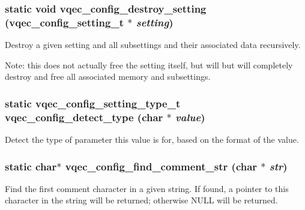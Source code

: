 \subsubsection{\setlength{\rightskip}{0pt plus 5cm}static void vqec\_\-config\_\-destroy\_\-setting (\bf{vqec\_\-config\_\-setting\_\-t} $\ast$ {\em setting})\hspace{0.3cm}{\tt  [static]}}\label{vqec__config__parser_8c_380f528f5fac5f97e504ab3643b6c8b2}


Destroy a given setting and all subsettings and their associated data recursively.

Note: this does not actually free the setting itself, but will but will completely destroy and free all associated memory and subsettings. 
\subsubsection{\setlength{\rightskip}{0pt plus 5cm}static \bf{vqec\_\-config\_\-setting\_\-type\_\-t} vqec\_\-config\_\-detect\_\-type (char $\ast$ {\em value})\hspace{0.3cm}{\tt  [static]}}\label{vqec__config__parser_8c_a6a0d33507e05baa62edf41d1f1e2ea0}


Detect the type of parameter this value is for, based on the format of the value. 
\subsubsection{\setlength{\rightskip}{0pt plus 5cm}static char$\ast$ vqec\_\-config\_\-find\_\-comment\_\-str (char $\ast$ {\em str})\hspace{0.3cm}{\tt  [static]}}\label{vqec__config__parser_8c_adfcb564583489d792becbb44e5b60ed}


Find the first comment character in a given string. If found, a pointer to this character in the string will be returned; otherwise NULL will be returned. 
